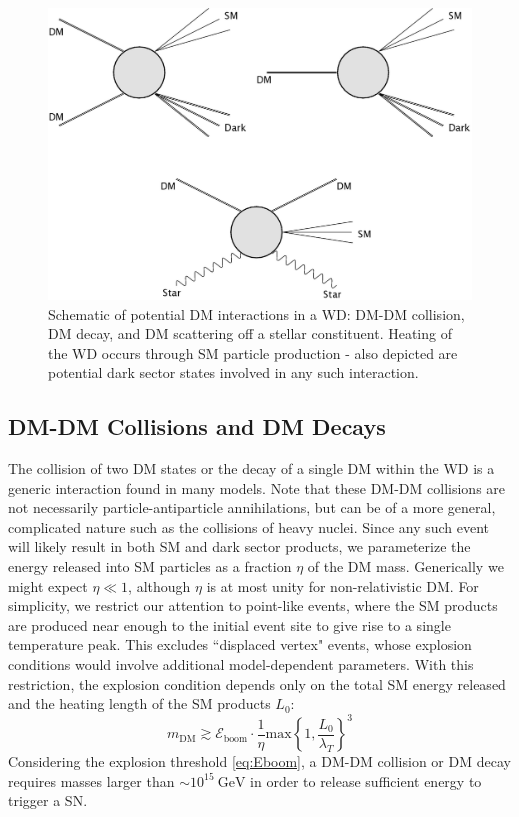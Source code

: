 \documentclass[twocolumn,showpacs,preprintnumbers,amsmath,amssymb,prd]{revtex4}
\newcommand{\GeV}{\text{GeV}}
\begin{document}
\begin{figure}
\includegraphics[scale=0.09]{feynmandiag.jpg}
\caption{Schematic of potential DM interactions in a WD: DM-DM collision, DM decay, and DM scattering off a stellar constituent.
Heating of the WD occurs through SM particle production - also depicted are potential dark sector states involved in any such interaction.}
\label{fig:feynman}
\end{figure}

\subsection{DM-DM Collisions and DM Decays}
\label{sec:coldecay}
The collision of two DM states or the decay of a single DM within the WD is a generic interaction found in many models.
Note that these DM-DM collisions are not necessarily particle-antiparticle annihilations, but can be of a more general, complicated nature such as the collisions of heavy nuclei.
Since any such event will likely result in both SM and dark sector products, we parameterize the energy released into SM particles as a fraction $\eta$ of the DM mass.
Generically we might expect $\eta \ll 1$, although $\eta$ is at most unity for non-relativistic DM.
For simplicity, we restrict our attention to point-like events, where the SM products are produced near enough to the initial event site to give rise to a single temperature peak.
This excludes ``displaced vertex" events, whose explosion conditions would involve additional model-dependent parameters.
With this restriction, the explosion condition depends only on the total SM energy released and the heating length of the SM products $L_0$:
\begin{equation}
\label{eq:coldecay}
    m_\text{DM} \gtrsim \mathcal{E}_\text{boom} \cdot \frac{1}{\eta}
      \text{max}\left\{1, \frac{L_0}{\lambda_T}\right\}^3
\end{equation}
Considering the explosion threshold \eqref{eq:Eboom}, a DM-DM collision or DM decay requires masses larger than $\sim 10^{15} ~\GeV$ in order to release sufficient energy to trigger a SN.
\end{document}
